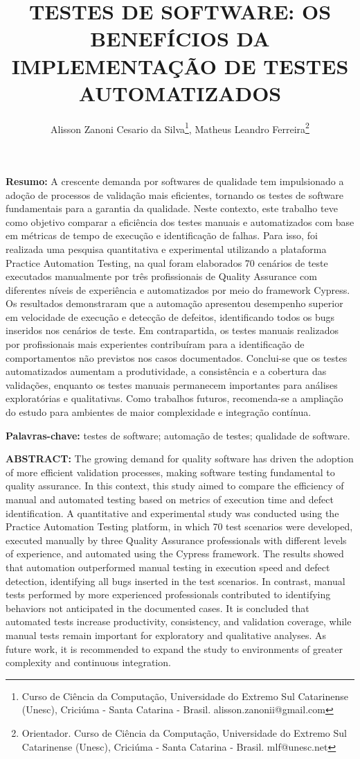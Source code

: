 \documentclass{UNESC}
\title{TESTES DE SOFTWARE: OS BENEFÍCIOS DA IMPLEMENTAÇÃO DE TESTES AUTOMATIZADOS}
\author
{
 Alisson Zanoni Cesario da Silva\footnote{Curso de Ciência da Computação, Universidade do Extremo Sul Catarinense (Unesc), Criciúma - Santa Catarina - Brasil. alisson.zanonii@gmail.com},
 Matheus Leandro Ferreira\footnote{Orientador. Curso de Ciência da Computação, Universidade do Extremo Sul Catarinense (Unesc), Criciúma - Santa Catarina - Brasil. mlf@unesc.net}
}
\begin{document}
\onehalfspacing
\maketitle

\noindent
\textbf{Resumo:} A crescente demanda por softwares de qualidade tem impulsionado a adoção de processos de validação mais eficientes, tornando os testes de software fundamentais para a garantia da qualidade. Neste contexto, este trabalho teve como objetivo comparar a eficiência dos testes manuais e automatizados com base em métricas de tempo de execução e identificação de falhas. Para isso, foi realizada uma pesquisa quantitativa e experimental utilizando a plataforma Practice Automation Testing, na qual foram elaborados 70 cenários de teste executados manualmente por três profissionais de Quality Assurance com diferentes níveis de experiência e automatizados por meio do framework Cypress. Os resultados demonstraram que a automação apresentou desempenho superior em velocidade de execução e detecção de defeitos, identificando todos os bugs inseridos nos cenários de teste. Em contrapartida, os testes manuais realizados por profissionais mais experientes contribuíram para a identificação de comportamentos não previstos nos casos documentados. Conclui-se que os testes automatizados aumentam a produtividade, a consistência e a cobertura das validações, enquanto os testes manuais permanecem importantes para análises exploratórias e qualitativas. Como trabalhos futuros, recomenda-se a ampliação do estudo para ambientes de maior complexidade e integração contínua.


\vspace{0.5em}
\noindent
\textbf{Palavras-chave:} testes de software; automação de testes; qualidade de software.

\vspace{1.0em}
\noindent
\textbf{ABSTRACT:} The growing demand for quality software has driven the adoption of more efficient validation processes, making software testing fundamental to quality assurance. In this context, this study aimed to compare the efficiency of manual and automated testing based on metrics of execution time and defect identification. A quantitative and experimental study was conducted using the Practice Automation Testing platform, in which 70 test scenarios were developed, executed manually by three Quality Assurance professionals with different levels of experience, and automated using the Cypress framework. The results showed that automation outperformed manual testing in execution speed and defect detection, identifying all bugs inserted in the test scenarios. In contrast, manual tests performed by more experienced professionals contributed to identifying behaviors not anticipated in the documented cases. It is concluded that automated tests increase productivity, consistency, and validation coverage, while manual tests remain important for exploratory and qualitative analyses. As future work, it is recommended to expand the study to environments of greater complexity and continuous integration.
\end{document}
